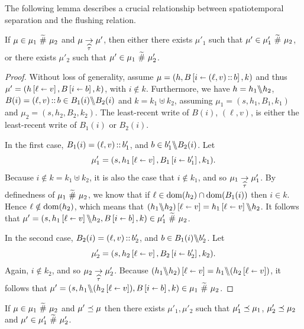 \documentclass[11pt]{report}         %
\begin{document}
The following lemma describes a crucial relationship between spatiotemporal separation and the flushing relation. 

\begin{lemma}
  \label{lem:separation-tau}
  If $\mu \in \mu_1 \operatorname{\,\widetilde{\#}\,} \mu_2$ and $\mu \underset{\widehat{\tau}}{\rightarrow} \mu'$, then either there exists $\mu'_1$ such that $\mu' \in \mu'_1 \operatorname{\,\widetilde{\#}\,} \mu_2$, or there exists $\mu'_2$ such that $\mu' \in \mu_1 \operatorname{\,\widetilde{\#}\,} \mu'_2$.
\end{lemma}

\begin{proof}
  Without loss of generality, assume $\mu = (h,B \left[ i \shortleftarrow (\ell,v)\operatorname{:\!:} b \right],k)$ and thus $\mu' = (h \left[ \ell \shortleftarrow v \right],B \left[ i \shortleftarrow b \right],k)$, with $i \notin k$. Furthermore, we have $h = h_1 \backslash\!\!\backslash h_2$, $B(i) = (\ell,v) \operatorname{:\!:} b \in B_1(i) \backslash\!\!\backslash B_2(i)$ and $k = k_1 \uplus k_2$, assuming $\mu_1 = (s,h_1,B_1,k_1)$ and $\mu_2 = (s,h_2,B_2,k_2)$. The least-recent write of $B(i)$, $(\ell,v)$, is either the least-recent write of $B_1(i)$ or $B_2(i)$. 

  In the first case, $B_1(i) = (\ell,v) \operatorname{:\!:} b_1'$, and $b \in b'_1 \backslash\!\!\backslash B_2(i)$. Let \[\mu'_1 = (s,h_1 \left[ \ell \shortleftarrow v \right],B_1 \left[ i \shortleftarrow b'_1 \right],k_1).\] Because $i \notin k = k_1 \uplus k_2$, it is also the case that $i \notin k_1$, and so $\mu_1 \underset{\widehat{\tau}}{\rightarrow} \mu'_1$. By definedness of $\mu_1 \operatorname{\,\widetilde{\#}\,} \mu_2$, we know that if $\ell \in \operatorname{\mathrm{dom}}(h_2) \cap \operatorname{\mathrm{dom}}(B_1(i))$ then $i \in k$. Hence $\ell \notin \operatorname{\mathrm{dom}}(h_2)$, which means that $(h_1 \backslash\!\!\backslash h_2) \left[ \ell \shortleftarrow v \right] = h_1 \left[ \ell \shortleftarrow v \right] \backslash\!\!\backslash h_2$. It follows that $\mu' = (s,h_1 \left[ \ell \shortleftarrow v \right] \backslash\!\!\backslash h_2, B \left[ i \shortleftarrow b \right],k) \in \mu'_1 \operatorname{\,\widetilde{\#}\,} \mu_2$.

  In the second case, $B_2(i) = (\ell,v) \operatorname{:\!:} b'_2$, and $b \in B_1(i) \backslash\!\!\backslash b'_2$. Let \[\mu'_2 = (s,h_2 \left[ \ell \shortleftarrow v \right],B_2 \left[ i \shortleftarrow b'_2 \right],k_2).\] Again, $i \notin k_2$, and so $\mu_2 \underset{\widehat{\tau}}{\rightarrow} \mu'_2$. Because $(h_1 \backslash\!\!\backslash h_2) \left[ \ell \shortleftarrow v \right] = h_1 \backslash\!\!\backslash (h_2 \left[ \ell \shortleftarrow v \right])$, it follows that $\mu' = (s,h_1 \backslash\!\!\backslash (h_2 \left[ \ell \shortleftarrow v \right]),B \left[ i \shortleftarrow b \right],k) \in \mu_1 \operatorname{\,\widetilde{\#}\,} \mu_2$. 
\end{proof}

\begin{lemma}
  \label{lem:separation-refinement}
  If $\mu \in \mu_1 \operatorname{\,\widetilde{\#}\,} \mu_2$ and $\mu' \preceq \mu$ then there exists $\mu'_1,\mu'_2$ such that $\mu'_1 \preceq \mu_1$, $\mu'_2 \preceq \mu_2$ and $\mu' \in \mu'_1 \operatorname{\,\widetilde{\#}\,} \mu'_2$. 
\end{lemma}
\end{document}
